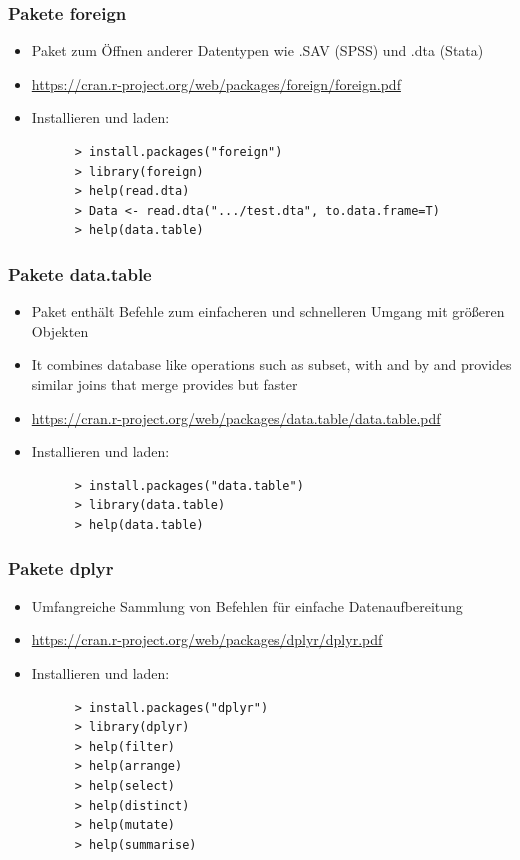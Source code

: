 \documentclass{beamer}
\begin{document}
\begin{frame}[fragile]
  \frametitle{Pakete foreign}
  \begin{itemize}
    \item Paket zum Öffnen anderer Datentypen wie .SAV (SPSS) und .dta (Stata)
    \item \url{https://cran.r-project.org/web/packages/foreign/foreign.pdf}
    \item Installieren und laden:
    \begin{Verbatim}
      > install.packages("foreign")
      > library(foreign)
      > help(read.dta)
      > Data <- read.dta(".../test.dta", to.data.frame=T)
      > help(data.table)
    \end{Verbatim}
  \end{itemize}
\end{frame}

\begin{frame}[fragile]
  \frametitle{Pakete data.table}
  \begin{itemize}
    \item Paket enthält Befehle zum einfacheren und schnelleren Umgang mit größeren Objekten
    \item It combines database like operations such as subset, with and by and provides similar joins that merge provides but faster
    \item \url{https://cran.r-project.org/web/packages/data.table/data.table.pdf}
     \item Installieren und laden:
    \begin{Verbatim}
      > install.packages("data.table")
      > library(data.table)
      > help(data.table)
    \end{Verbatim}
  \end{itemize}
\end{frame}

\begin{frame}[fragile]
  \frametitle{Pakete dplyr}
  \begin{itemize}
    \item Umfangreiche Sammlung von Befehlen für einfache Datenaufbereitung
    \item \url{https://cran.r-project.org/web/packages/dplyr/dplyr.pdf}
    \item Installieren und laden:
    \begin{Verbatim}
      > install.packages("dplyr")
      > library(dplyr)
      > help(filter)
      > help(arrange)
      > help(select)
      > help(distinct)
      > help(mutate)
      > help(summarise)
    \end{Verbatim}
  \end{itemize}
\end{frame}
\end{document}
